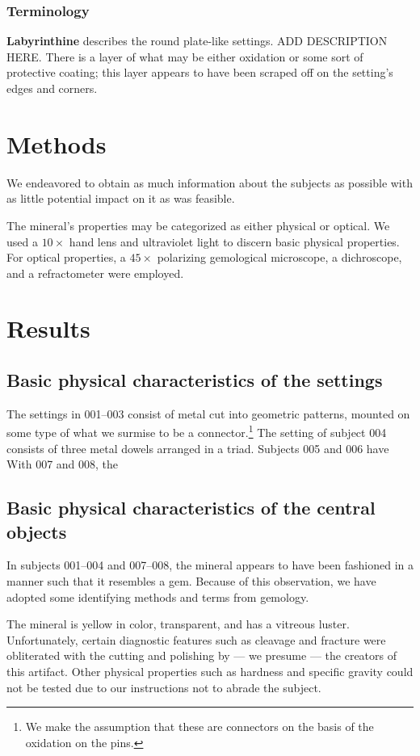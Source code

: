 \documentclass[10pt]{article}
\begin{document}
\subsubsection{Terminology}

\textbf{Labyrinthine} describes the round plate-like settings. ADD DESCRIPTION HERE.
There is a layer of what may be either oxidation or some sort of protective coating; this layer appears to have been scraped off on the setting's edges and corners.

\section{Methods}
We endeavored to obtain as much information about the subjects as possible with as little potential impact on it as was feasible.

The mineral's properties may be categorized as either physical or optical.
We used a $10\times$ hand lens and ultraviolet light to discern basic physical properties.
For optical properties, a $45\times$ polarizing gemological microscope, a dichroscope, and a refractometer were employed.

\section{Results}

\subsection{Basic physical characteristics of the settings}
The settings in 001--003 consist of metal cut into geometric patterns, mounted on some type of what we surmise to be a connector.\footnote{We make the assumption that these are connectors on the basis of the oxidation on the pins.}
The setting of subject 004 consists of three metal dowels arranged in a triad.  
Subjects 005 and 006 have
With 007 and 008, the 

\subsection{Basic physical characteristics of the central objects}
In subjects 001--004 and 007--008, the mineral appears to have been fashioned in a manner such that it resembles a gem.
Because of this observation, we have adopted some identifying methods and terms from gemology.

The mineral is yellow in color, transparent, and has a vitreous luster.
Unfortunately, certain diagnostic features such as cleavage and fracture were obliterated with the cutting and polishing by --- we presume --- the creators of this artifact.
Other physical properties such as hardness and specific gravity could not be tested due to our instructions not to abrade the subject.
\end{document}
